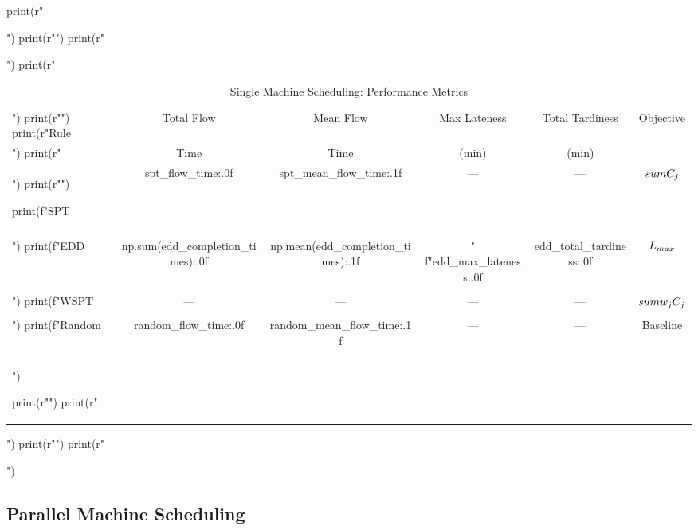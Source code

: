 \documentclass[a4paper, 11pt]{article}
\begin{document}
\begin{pycode}
print(r"\begin{table}[htbp]")
print(r"\centering")
print(r"\caption{Single Machine Scheduling: Performance Metrics}")
print(r"\begin{tabular}{lccccc}")
print(r"\toprule")
print(r"Rule & Total Flow & Mean Flow & Max Lateness & Total Tardiness & Objective \\")
print(r"     & Time       & Time      & (min)        & (min)           &            \\")
print(r"\midrule")

print(f"SPT    & {spt_flow_time:.0f} & {spt_mean_flow_time:.1f} & --- & --- & $\\sum C_j$ \\\\")
print(f"EDD    & {np.sum(edd_completion_times):.0f} & {np.mean(edd_completion_times):.1f} & "
      f"{edd_max_lateness:.0f} & {edd_total_tardiness:.0f} & $L_{{\\max}}$ \\\\")
print(f"WSPT   & --- & --- & --- & --- & $\\sum w_j C_j$ \\\\")
print(f"Random & {random_flow_time:.0f} & {random_mean_flow_time:.1f} & --- & --- & Baseline \\\\")

print(r"\bottomrule")
print(r"\end{tabular}")
print(r"\label{tab:single_machine}")
print(r"\end{table}")
\end{pycode}

\subsection{Parallel Machine Scheduling}
\end{document}
